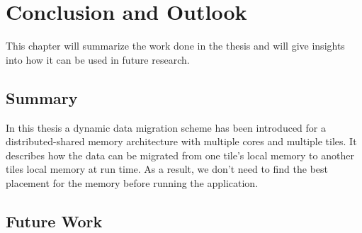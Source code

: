 \documentclass{listhesis}
\begin{document}
\chapter{Conclusion and Outlook}
This chapter will summarize the work done in the thesis and will give insights into how it can be used in future research. 
\section{Summary}
In this thesis a dynamic data migration scheme has been introduced for a distributed-shared memory architecture with multiple cores and multiple tiles. It describes how the data can be migrated from one tile's  local memory to another tiles local memory at run time. As a result, we don't need to find the best placement for the memory before running the application.
\section{Future Work}

\cleardoublepage



\confirmation
\end{document}

